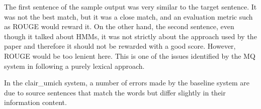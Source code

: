 \documentclass[11pt]{article}
\begin{document}
\noindent{}
The first sentence of the sample output was very similar to the target sentence. It was not the best match, but it was a close match, and an evaluation metric such as ROUGE would reward it. On the other hand, the second sentence, even though it talked about HMMs, it was not strictly about the approach used by the paper and therefore it should not be rewarded with a good score. However, ROUGE would be too lenient here. This is one of the issues identified by the MQ system in following a purely lexical approach.

In the clair\_umich system, a number of errors made by the baseline system are due to source sentences that match the words but differ slightly in their information content. 
\end{document}
